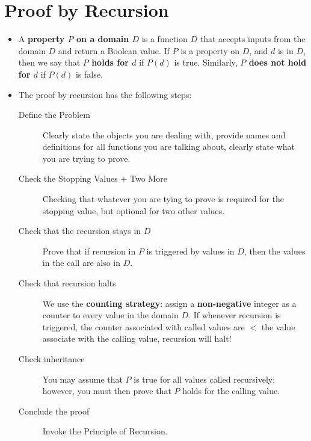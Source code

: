 \documentclass[12pt]{scrartcl}
\begin{document}
\section{Proof by Recursion}
\begin{itemize}
    \item A \textbf{property $P$ on a domain $D$} is a function $D$ that accepts inputs from the domain $D$ and return a Boolean value. If $P$ is a property on $D$, and $d$ is in $D$, then we say that \textbf{$P$ holds for $d$} if $P(d)$ is true. Similarly, \textbf{$P$ does not hold for $d$} if $P(d)$ is false.

    \item The proof by recursion has the following steps:

        \begin{description}
            \item[Define the Problem] Clearly state the objects you are dealing with, provide names and definitions for all functions you are talking about, clearly state what you are trying to prove.
            \item[Check the Stopping Values + Two More] Checking that whatever you are tying to prove is required for the stopping value, but optional for two other values.
            \item[Check that the recursion stays in $D$] Prove that if recursion in $P$ is triggered by values in $D$, then the values in the call are also in $D$.
            \item[Check that recursion halts] We use the \textbf{counting strategy}: assign a \textbf{non-negative} integer as a counter to every value in the domain $D$. If whenever recursion is triggered, the counter associated with called values are $<$ the value associate with the calling value, recursion will halt!
            \item[Check inheritance] You may assume that $P$ is true for all values called recursively; however, you must then prove that $P$ holds for the calling value.
            \item[Conclude the proof] Invoke the Principle of Recursion.
        \end{description}
\end{itemize}
\end{document}
